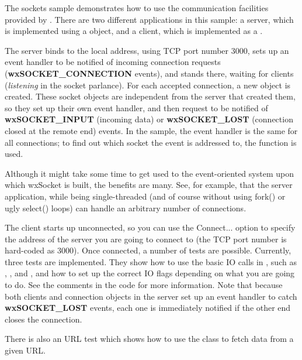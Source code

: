 The sockets sample demonstrates how to use the communication facilities
provided by . There are two different
applications in this sample: a server, which is implemented using a 
 object, and a client, which
is implemented as a .

The server binds to the local address, using TCP port number 3000,
sets up an event handler to be notified of incoming connection requests
({\bf wxSOCKET\_CONNECTION} events), and stands there, waiting for clients
({\it listening} in the socket parlance). For each accepted connection,
a new  object is created. These
socket objects are independent from the server that created them, so
they set up their own event handler, and then request to be notified
of {\bf wxSOCKET\_INPUT} (incoming data) or {\bf wxSOCKET\_LOST} 
(connection closed at the remote end) events. In the sample, the event
handler is the same for all connections; to find out which socket the
event is addressed to, the  function
is used.

Although it might take some time to get used to the event-oriented
system upon which wxSocket is built, the benefits are many. See, for
example, that the server application, while being single-threaded
(and of course without using fork() or ugly select() loops) can handle
an arbitrary number of connections.

The client starts up unconnected, so you can use the Connect... option
to specify the address of the server you are going to connect to (the
TCP port number is hard-coded as 3000). Once connected, a number of
tests are possible. Currently, three tests are implemented. They show
how to use the basic IO calls in ,
such as , , 
 and ,
and how to set up the correct IO flags depending on what you are going to
do. See the comments in the code for more information. Note that because
both clients and connection objects in the server set up an event handler
to catch {\bf wxSOCKET\_LOST} events, each one is immediately notified
if the other end closes the connection.

There is also an URL test which shows how to use
the  class to fetch data from a given URL.

